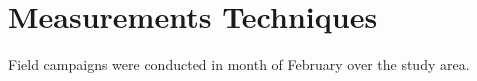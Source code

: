 \chapter{Measurements Techniques}
Field campaigns were conducted in month of February over the study area. 




